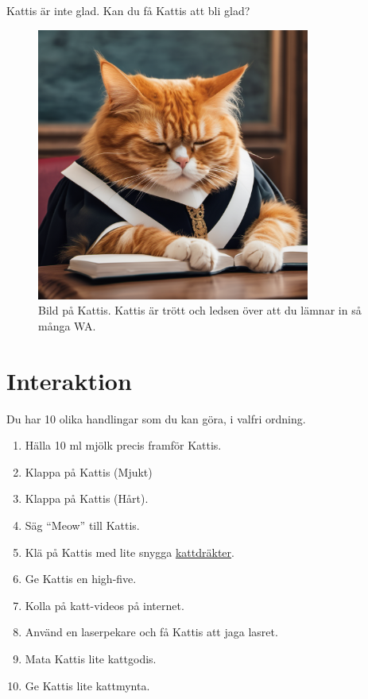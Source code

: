 
Kattis är inte glad. Kan du få Kattis att bli glad?

\begin{centering}
  \begin{figure}[h]
      \centering
      \includegraphics[width=0.8\textwidth]{tired-kattis.png}
      \caption{Bild på Kattis. Kattis är trött och ledsen över att du lämnar in så många WA. }
  \end{figure}
\end{centering}


\section*{Interaktion}
Du har 10 olika handlingar som du kan göra, i valfri ordning. 

\begin{enumerate}
  \item Hälla 10 ml mjölk precis framför Kattis.
  \item Klappa på Kattis (Mjukt)
  \item Klappa på Kattis (Hårt).
  \item Säg ``Meow'' till Kattis.
  \item Klä på Kattis med lite snygga \href{https://www.amazon.se/kostymer-roliga-husdjur-kattunge-outfits/dp/B08XX7W5F9}{kattdräkter}.
  \item Ge Kattis en high-five.
  \item Kolla på katt-videos på internet.
  \item Använd en laserpekare och få Kattis att jaga lasret. 
  \item Mata Kattis lite kattgodis.
  \item Ge Kattis lite kattmynta.
\end{enumerate}

